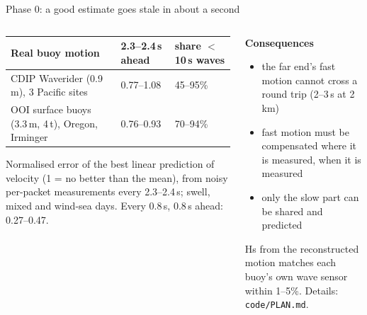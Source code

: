 \documentclass[aspectratio=169,11pt]{beamer}
\begin{document}
\begin{frame}{Phase 0: a good estimate goes stale in about a second}
\begin{columns}[T]
\begin{column}{0.56\textwidth}
\scriptsize\setlength{\tabcolsep}{3pt}
\begin{tabular}{@{}L{0.42\textwidth}L{0.25\textwidth}L{0.25\textwidth}@{}}
\toprule
\textbf{Real buoy motion} & \textbf{2.3--2.4\,s ahead} & \textbf{share $<$10\,s waves}\\
\midrule
CDIP Waverider (0.9\,m), 3 Pacific sites & 0.77--1.08 & 45--95\%\\
OOI surface buoys (3.3\,m, 4\,t), Oregon, Irminger & 0.76--0.93 & 70--94\%\\
\bottomrule
\end{tabular}

\smallskip
{\scriptsize Normalised error of the best linear prediction of velocity (1 = no better than the mean), from noisy per-packet measurements every 2.3--2.4\,s; swell, mixed and wind-sea days. Every 0.8\,s, 0.8\,s ahead: 0.27--0.47.}
\end{column}
\begin{column}{0.40\textwidth}
\footnotesize
\textbf{Consequences}
\begin{itemize}\setlength{\itemsep}{1pt}
\item the far end's fast motion \alert{cannot cross a round trip} (2--3\,s at 2\,km)
\item fast motion must be compensated \alert{where it is measured, when it is measured}
\item only the slow part can be shared and predicted
\end{itemize}
{\color{mute}Hs from the reconstructed motion matches each buoy's own wave sensor within 1--5\%. Details: \texttt{code/PLAN.md}.}
\end{column}
\end{columns}
\end{frame}
\end{document}
